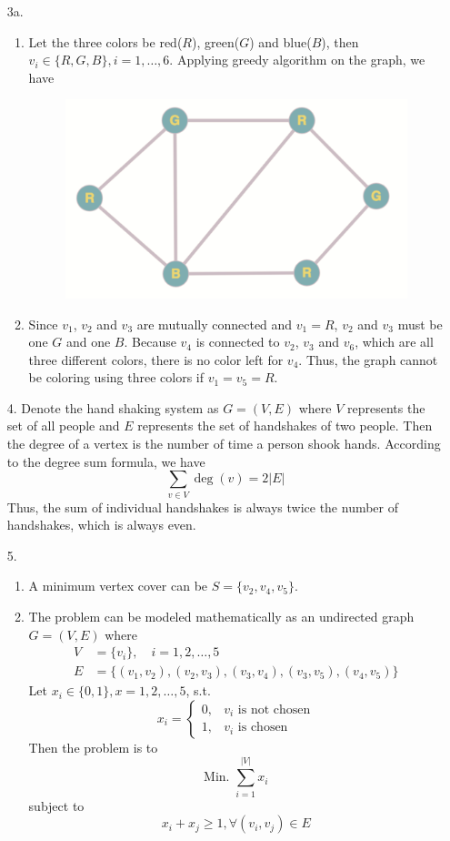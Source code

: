 \documentclass[10pt]{report}
\newcommand{\abs}[1] {\left| #1 \right|}
\begin{document}
\begin{enumerate}
	\item [3a.]
	\begin{enumerate}
		\item 
		Let the three colors be red($R$), green($G$) and blue($B$), then $v_i \in \{R,G,B\}, i=1,\dots,6$. Applying greedy algorithm on the graph, we have
		\begin{figure}[H]
			\centering
			\includegraphics[width=0.4\linewidth]{3-1.png}
		\end{figure}
	
		\item 
		Since $v_1$, $v_2$ and $v_3$ are mutually connected and $v_1 = R$, $v_2$ and $v_3$ must be one $G$ and one $B$. Because $v_4$ is connected to $v_2$, $v_3$ and $v_6$, which are all three different colors, there is no color left for $v_4$. Thus, the graph cannot be coloring using three colors if $v_1 = v_5 = R$.
	\end{enumerate}

	\item [4.]
	Denote the hand shaking system as $G=(V, E)$ where $V$ represents the set of all people and $E$ represents the set of handshakes of two people. Then the degree of a vertex is the number of time a person shook hands. According to the degree sum formula, we have
	\[
	\sum_{v\in V} \deg(v) = 2\abs{E}
	\]
	Thus, the sum of individual handshakes is always twice the number of handshakes, which is always even.
	
	\item [5.]
	\begin{enumerate}
		\item 
		A minimum vertex cover can be $S=\{v_2, v_4, v_5\}$.
		
		\item 
		The problem can be modeled mathematically as an undirected graph $G=(V, E)$ where
		\begin{align*}
			V &= \{v_i\}, \quad i=1,2,\dots,5\\
			E &= \{(v_1, v_2), (v_2, v_3), (v_3, v_4), (v_3, v_5), (v_4, v_5)\}
		\end{align*}
		Let $x_i \in \{0,1\}, x=1,2,\dots,5$, s.t.
		\[
		x_i = 
		\begin{cases}
		0, & v_i \text{ is not chosen}\\
		1, & v_i \text{ is chosen}
		\end{cases}
		\]
		Then the problem is to
		\[
		\text{Min. } \sum_{i = 1}^{\abs{V}} x_i
		\]
		subject to
		\[
		x_i + x_j \ge 1, \forall (v_i, v_j) \in E
		\]
	\end{enumerate}
	

\end{enumerate}
\end{document}
